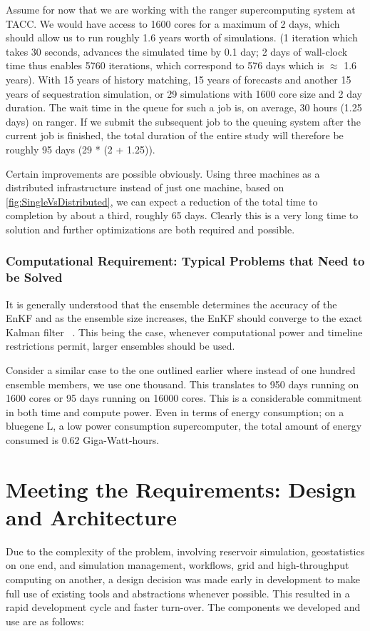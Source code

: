 \documentclass{rspublic}
\newcommand{\up}{\vspace*{-0.3em}}
\begin{document}
Assume for now that we are working with the ranger supercomputing
system at TACC. We would have access to 1600 cores for a maximum of 2
days, which should allow us to run roughly 1.6 years worth of
simulations. (1 iteration which takes 30 seconds, advances the
simulated time by 0.1 day; 2 days of wall-clock time thus enables 5760
iterations, which correspond to 576 days which is $\approx$ 1.6
years). With 15 years of history matching, 15 years of forecasts and
another 15 years of sequestration simulation, or 29 simulations with
1600 core size and 2 day duration. The wait time in the queue for such
a job is, on average, 30 hours (1.25 days) on ranger. If we submit the
subsequent job to the queuing system after the current job is
finished, the total duration of the entire study will therefore be
roughly 95 days (29 * (2 + 1.25)).

Certain improvements are possible obviously. Using three machines as a
distributed infrastructure instead of just one machine, based on
\ref{fig:SingleVsDistributed}, we can expect a reduction of the total
time to completion by about a third, roughly 65 days. Clearly this is
a very long time to solution and further optimizations are both
required and possible.
\up\up
\subsubsection{Computational Requirement: Typical Problems that Need to be Solved}
It is generally understood that the ensemble determines the accuracy
of the EnKF and as the ensemble size increases, the EnKF should
converge to the exact Kalman filter ~\cite{JiaLi}. This being the
case, whenever computational power and timeline restrictions permit,
larger ensembles should be used.

Consider a similar case to the one outlined earlier where instead of
one hundred ensemble members, we use one thousand. This translates to
950 days running on 1600 cores or 95 days running on 16000 cores.
This is a considerable commitment in both time and compute power. Even
in terms of energy consumption; on a bluegene L, a low power
consumption supercomputer, the total amount of energy consumed is 0.62
Giga-Watt-hours.

\up\up
\section{Meeting the Requirements: Design and Architecture}

Due to the complexity of the problem, involving reservoir simulation,
geostatistics on one end, and simulation management, workflows, grid
and high-throughput computing on another, a design decision was made
early in development to make full use of existing tools and
abstractions whenever possible. This resulted in a rapid development
cycle and faster turn-over. The components we developed and use are as
follows:
\end{document}
